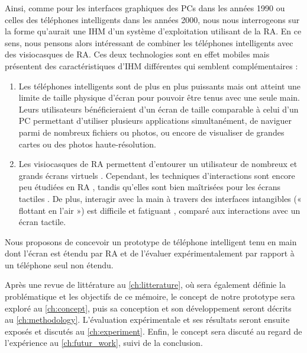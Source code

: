 
Ainsi, comme pour les interfaces graphiques des PCs dans les années 1990 ou celles des téléphones intelligents dans les années 2000, nous nous interrogeons sur la forme qu'aurait une IHM d'un système d'exploitation utilisant de la RA. En ce sens, nous pensons alors intéressant de combiner les téléphones intelligents avec des visiocasques de RA. Ces deux technologies sont en effet mobiles mais présentent des caractéristiques d'IHM différentes qui semblent complémentaires :
\begin{enumerate}
  \item Les téléphones intelligents sont de plus en plus puissants mais ont atteint une limite de taille physique d'écran pour pouvoir être tenus avec une seule main. Leurs utilisateurs bénéficieraient d'un écran de taille comparable à celui d'un PC permettant d'utiliser plusieurs applications simultanément, de naviguer parmi de nombreux fichiers ou photos, ou encore de visualiser de grandes cartes ou des photos haute-résolution.
  \item Les visiocasques de RA permettent d'entourer un utilisateur de nombreux et grands écrans virtuels \citep{Ens2014}. Cependant, 
  les techniques d'interactions sont encore peu étudiées en RA \citep{Piumsomboon2013}, tandis qu'elles sont bien maîtrisées pour les écrans tactiles \citep{Wobbrock2009}. De plus, interagir avec la main à travers des interfaces intangibles (« flottant en l'air ») est difficile \citep{Chan2010} et fatiguant \citep{Hincapie-Ramos2014}, comparé aux interactions avec un écran tactile.
\end{enumerate}

Nous proposons de concevoir un prototype de téléphone intelligent tenu en main dont l'écran est étendu par RA et de l'évaluer expérimentalement par rapport à un téléphone seul non étendu.

Après une revue de littérature au \autoref{ch:litterature}, où sera également définie la problématique et les objectifs de ce mémoire, le concept de notre prototype sera exploré au \autoref{ch:concept}, puis sa conception et son développement seront décrits au \autoref{ch:methodology}. L'évaluation expérimentale et ses résultats seront ensuite exposés et discutés au \autoref{ch:experiment}. Enfin, le concept sera discuté au regard de l'expérience au \autoref{ch:futur_work}, suivi de la conclusion.